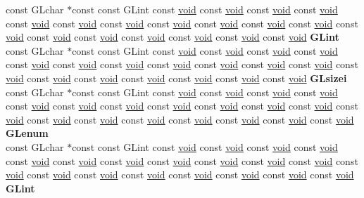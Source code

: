 \begin{DoxyCompactItemize}
\begin{tabbing}
\>const GLchar $\ast$const const GLint const \hyperlink{interfacevoid}{void} const \hyperlink{interfacevoid}{void} const \hyperlink{interfacevoid}{void} const \hyperlink{interfacevoid}{void} const \hyperlink{interfacevoid}{void} const \hyperlink{interfacevoid}{void} const \hyperlink{interfacevoid}{void} const \hyperlink{interfacevoid}{void} const \hyperlink{interfacevoid}{void} const \hyperlink{interfacevoid}{void} const \hyperlink{interfacevoid}{void} const \hyperlink{interfacevoid}{void} const \hyperlink{interfacevoid}{void} const \hyperlink{interfacevoid}{void} const \hyperlink{interfacevoid}{void} const \hyperlink{interfacevoid}{void} const \hyperlink{interfacevoid}{void} const \hyperlink{interfacevoid}{void} {\bfseries GLint}\\
\>const GLchar $\ast$const const GLint const \hyperlink{interfacevoid}{void} const \hyperlink{interfacevoid}{void} const \hyperlink{interfacevoid}{void} const \hyperlink{interfacevoid}{void} const \hyperlink{interfacevoid}{void} const \hyperlink{interfacevoid}{void} const \hyperlink{interfacevoid}{void} const \hyperlink{interfacevoid}{void} const \hyperlink{interfacevoid}{void} const \hyperlink{interfacevoid}{void} const \hyperlink{interfacevoid}{void} const \hyperlink{interfacevoid}{void} const \hyperlink{interfacevoid}{void} const \hyperlink{interfacevoid}{void} const \hyperlink{interfacevoid}{void} const \hyperlink{interfacevoid}{void} const \hyperlink{interfacevoid}{void} const \hyperlink{interfacevoid}{void} {\bfseries GLsizei}\\
\>const GLchar $\ast$const const GLint const \hyperlink{interfacevoid}{void} const \hyperlink{interfacevoid}{void} const \hyperlink{interfacevoid}{void} const \hyperlink{interfacevoid}{void} const \hyperlink{interfacevoid}{void} const \hyperlink{interfacevoid}{void} const \hyperlink{interfacevoid}{void} const \hyperlink{interfacevoid}{void} const \hyperlink{interfacevoid}{void} const \hyperlink{interfacevoid}{void} const \hyperlink{interfacevoid}{void} const \hyperlink{interfacevoid}{void} const \hyperlink{interfacevoid}{void} const \hyperlink{interfacevoid}{void} const \hyperlink{interfacevoid}{void} const \hyperlink{interfacevoid}{void} const \hyperlink{interfacevoid}{void} const \hyperlink{interfacevoid}{void} const \hyperlink{interfacevoid}{void} {\bfseries GLenum}\\
\>const GLchar $\ast$const const GLint const \hyperlink{interfacevoid}{void} const \hyperlink{interfacevoid}{void} const \hyperlink{interfacevoid}{void} const \hyperlink{interfacevoid}{void} const \hyperlink{interfacevoid}{void} const \hyperlink{interfacevoid}{void} const \hyperlink{interfacevoid}{void} const \hyperlink{interfacevoid}{void} const \hyperlink{interfacevoid}{void} const \hyperlink{interfacevoid}{void} const \hyperlink{interfacevoid}{void} const \hyperlink{interfacevoid}{void} const \hyperlink{interfacevoid}{void} const \hyperlink{interfacevoid}{void} const \hyperlink{interfacevoid}{void} const \hyperlink{interfacevoid}{void} const \hyperlink{interfacevoid}{void} const \hyperlink{interfacevoid}{void} const \hyperlink{interfacevoid}{void} {\bfseries GLint}\\

\end{tabbing}
\end{DoxyCompactItemize}

